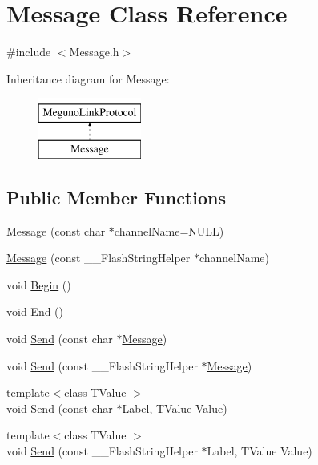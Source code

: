 \hypertarget{class_message}{\section{Message Class Reference}
\label{class_message}
}


{\ttfamily \#include $<$Message.\-h$>$}

Inheritance diagram for Message\-:\begin{figure}[H]
\begin{center}
\leavevmode
\includegraphics[height=2.000000cm]{class_message}
\end{center}
\end{figure}
\subsection*{Public Member Functions}
\begin{DoxyCompactItemize}
\item 
\hyperlink{class_message_a460d9f3ba716241c7c4bf55c23903a73}{Message} (const char $\ast$channel\-Name=N\-U\-L\-L)
\item 
\hyperlink{class_message_ae95e70d292b0e54ad64ee6b8ea7d65a1}{Message} (const \-\_\-\-\_\-\-Flash\-String\-Helper $\ast$channel\-Name)
\item 
void \hyperlink{class_message_af0d5fbdac966705013184933f7b8a724}{Begin} ()
\item 
void \hyperlink{class_message_a64176950649effe3ecd9f919684a13da}{End} ()
\item 
void \hyperlink{class_message_a13a592cd37786c29f0fd497d8e11ae4b}{Send} (const char $\ast$\hyperlink{class_message}{Message})
\item 
void \hyperlink{class_message_a7b9f8629da77478d49be0814292f1d66}{Send} (const \-\_\-\-\_\-\-Flash\-String\-Helper $\ast$\hyperlink{class_message}{Message})
\item 
{\footnotesize template$<$class T\-Value $>$ }\\void \hyperlink{class_message_a540dc189a00c99e48d69c97e15eb87f7}{Send} (const char $\ast$Label, T\-Value Value)
\item 
{\footnotesize template$<$class T\-Value $>$ }\\void \hyperlink{class_message_a5e9a87d314df43a7c163cb21120953ed}{Send} (const \-\_\-\-\_\-\-Flash\-String\-Helper $\ast$Label, T\-Value Value)
\end{DoxyCompactItemize}
